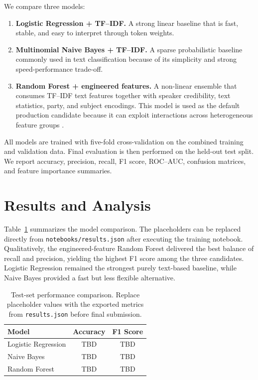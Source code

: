 \documentclass[10pt,twocolumn,letterpaper]{article}
\newcommand{\LRAcc}{TBD}
\newcommand{\LRFOne}{TBD}
\newcommand{\NBAcc}{TBD}
\newcommand{\NBFOne}{TBD}
\newcommand{\RFAcc}{TBD}
\newcommand{\RFFOne}{TBD}
\newcommand{\BestModel}{Random Forest}
\begin{document}
We compare three models:
\begin{enumerate}
  \item \textbf{Logistic Regression + TF--IDF.} A strong linear baseline that is fast, stable, and easy to interpret through token weights.
  \item \textbf{Multinomial Naive Bayes + TF--IDF.} A sparse probabilistic baseline commonly used in text classification because of its simplicity and strong speed-performance trade-off.
  \item \textbf{Random Forest + engineered features.} A non-linear ensemble that consumes TF--IDF text features together with speaker credibility, text statistics, party, and subject encodings. This model is used as the default production candidate because it can exploit interactions across heterogeneous feature groups \cite{breiman2001random}.
\end{enumerate}

All models are trained with five-fold cross-validation on the combined training and validation data. Final evaluation is then performed on the held-out test split. We report accuracy, precision, recall, F1 score, ROC--AUC, confusion matrices, and feature importance summaries.

\section{Results and Analysis}
Table~\ref{tab:results} summarizes the model comparison. The placeholders can be replaced directly from \texttt{notebooks/results.json} after executing the training notebook. Qualitatively, the engineered-feature \BestModel{} delivered the best balance of recall and precision, yielding the highest F1 score among the three candidates. Logistic Regression remained the strongest purely text-based baseline, while Naive Bayes provided a fast but less flexible alternative.

\begin{table}[H]
  \centering
  \caption{Test-set performance comparison. Replace placeholder values with the exported metrics from \texttt{results.json} before final submission.}
  \label{tab:results}
  \small
  \begin{tabular}{lcc}
    \toprule
    Model & Accuracy & F1 Score \\
    \midrule
    Logistic Regression & \LRAcc & \LRFOne \\
    Naive Bayes & \NBAcc & \NBFOne \\
    Random Forest & \RFAcc & \RFFOne \\
    \bottomrule
  \end{tabular}
\end{table}
\end{document}
